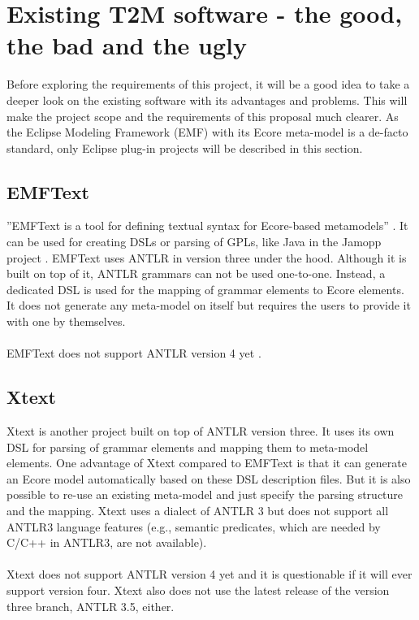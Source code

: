\section{Existing T2M software - the good, the bad and the ugly}

Before exploring the requirements of this project, it will be a good idea to 
take a deeper look on the existing software with its advantages and 
problems. This will make the project scope and the requirements of this
proposal much clearer.
As the Eclipse Modeling Framework (EMF) with its Ecore meta-model is
a de-facto standard, only Eclipse plug-in projects will be described in this
section.

\subsection{EMFText}
''EMFText is a tool for defining textual syntax for Ecore-based metamodels''
\cite{Heidenreich2011model}.
It can be used for creating DSLs or parsing of GPLs, like Java in the Jamopp project
\cite{Heidenreich2009closing}\cite{heidenreich2011jamopp}.
EMFText uses ANTLR in version three under the hood.
Although it is built on top of it, ANTLR grammars can not be used one-to-one.
Instead, a dedicated DSL is used for the mapping of grammar elements to Ecore
elements.
It does not generate any
meta-model on itself but requires the users to provide it with one by themselves.
\\ \ \\
EMFText does not support ANTLR version 4 yet \cite{ANTLR4_EMFText}.

\subsection{Xtext}
Xtext\cite{Bettini2013implementing} is another project built on top of ANTLR version three.
It uses its own DSL for parsing of grammar elements and mapping them to meta-model elements.
One advantage of Xtext compared to EMFText is that it can generate an Ecore model automatically
based on these DSL description files. But it is also possible to re-use an existing meta-model
and just specify the parsing structure and the mapping. Xtext uses a dialect of ANTLR 3 but does 
not support all ANTLR3 language features (e.g., semantic predicates, which are needed
by C/C++ in ANTLR3, are not available).
\\ \ \\
Xtext does not support ANTLR version 4 yet \cite{ANTLR4_XText} and it is questionable
if it will ever support version four.
Xtext also does not use the latest release of the version three
branch, ANTLR 3.5, either. 


